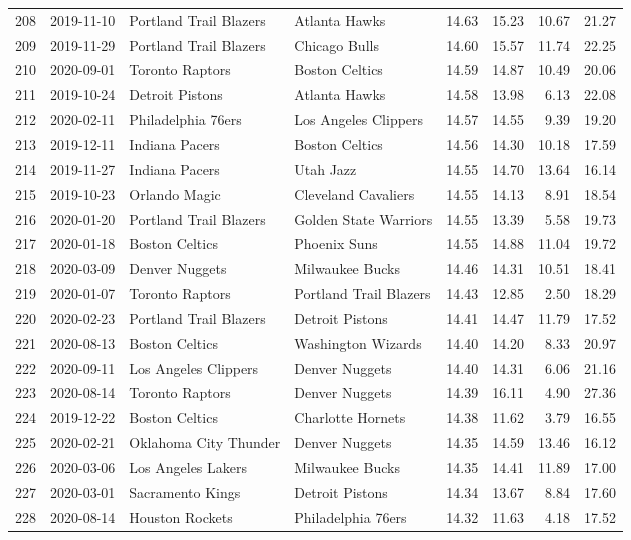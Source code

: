 \documentclass[
  11pt,
]{article}
\theoremstyle{nonumberplain}
\begin{document}
\begin{longtable}{rl|llr|rrr}
208 & 2019-11-10 & Portland Trail Blazers & Atlanta Hawks & 14.63 & 15.23 & 10.67 & 21.27\\
209 & 2019-11-29 & Portland Trail Blazers & Chicago Bulls & 14.60 & 15.57 & 11.74 & 22.25\\
210 & 2020-09-01 & Toronto Raptors & Boston Celtics & 14.59 & 14.87 & 10.49 & 20.06\\
211 & 2019-10-24 & Detroit Pistons & Atlanta Hawks & 14.58 & 13.98 & 6.13 & 22.08\\
212 & 2020-02-11 & Philadelphia 76ers & Los Angeles Clippers & 14.57 & 14.55 & 9.39 & 19.20\\
213 & 2019-12-11 & Indiana Pacers & Boston Celtics & 14.56 & 14.30 & 10.18 & 17.59\\
214 & 2019-11-27 & Indiana Pacers & Utah Jazz & 14.55 & 14.70 & 13.64 & 16.14\\
215 & 2019-10-23 & Orlando Magic & Cleveland Cavaliers & 14.55 & 14.13 & 8.91 & 18.54\\
216 & 2020-01-20 & Portland Trail Blazers & Golden State Warriors & 14.55 & 13.39 & 5.58 & 19.73\\
217 & 2020-01-18 & Boston Celtics & Phoenix Suns & 14.55 & 14.88 & 11.04 & 19.72\\
218 & 2020-03-09 & Denver Nuggets & Milwaukee Bucks & 14.46 & 14.31 & 10.51 & 18.41\\
219 & 2020-01-07 & Toronto Raptors & Portland Trail Blazers & 14.43 & 12.85 & 2.50 & 18.29\\
220 & 2020-02-23 & Portland Trail Blazers & Detroit Pistons & 14.41 & 14.47 & 11.79 & 17.52\\
221 & 2020-08-13 & Boston Celtics & Washington Wizards & 14.40 & 14.20 & 8.33 & 20.97\\
222 & 2020-09-11 & Los Angeles Clippers & Denver Nuggets & 14.40 & 14.31 & 6.06 & 21.16\\
223 & 2020-08-14 & Toronto Raptors & Denver Nuggets & 14.39 & 16.11 & 4.90 & 27.36\\
224 & 2019-12-22 & Boston Celtics & Charlotte Hornets & 14.38 & 11.62 & 3.79 & 16.55\\
225 & 2020-02-21 & Oklahoma City Thunder & Denver Nuggets & 14.35 & 14.59 & 13.46 & 16.12\\
226 & 2020-03-06 & Los Angeles Lakers & Milwaukee Bucks & 14.35 & 14.41 & 11.89 & 17.00\\
227 & 2020-03-01 & Sacramento Kings & Detroit Pistons & 14.34 & 13.67 & 8.84 & 17.60\\
228 & 2020-08-14 & Houston Rockets & Philadelphia 76ers & 14.32 & 11.63 & 4.18 & 17.52\\

\end{longtable}
\end{document}
